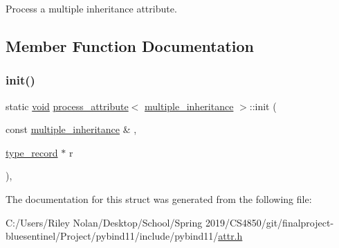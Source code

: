 Process a multiple inheritance attribute. 

\subsection{Member Function Documentation}
\mbox{\label{structprocess__attribute_3_01multiple__inheritance_01_4_a1c4e9d7b5d49bd1887aab75ba8371192}} 
\subsubsection{\texorpdfstring{init()}{init()}}
{\footnotesize\ttfamily static \mbox{\hyperlink{_s_d_l__opengles2__gl2ext_8h_ae5d8fa23ad07c48bb609509eae494c95}{void}} \mbox{\hyperlink{structprocess__attribute}{process\+\_\+attribute}}$<$ \mbox{\hyperlink{structmultiple__inheritance}{multiple\+\_\+inheritance}} $>$\+::init (\begin{DoxyParamCaption}\item[{const \mbox{\hyperlink{structmultiple__inheritance}{multiple\+\_\+inheritance}} \&}]{,  }\item[{\mbox{\hyperlink{structtype__record}{type\+\_\+record}} $\ast$}]{r }\end{DoxyParamCaption})\hspace{0.3cm}{\ttfamily [inline]}, {\ttfamily [static]}}



The documentation for this struct was generated from the following file\+:\begin{DoxyCompactItemize}
\item 
C\+:/\+Users/\+Riley Nolan/\+Desktop/\+School/\+Spring 2019/\+C\+S4850/git/finalproject-\/bluesentinel/\+Project/pybind11/include/pybind11/\mbox{\hyperlink{attr_8h}{attr.\+h}}\end{DoxyCompactItemize}
